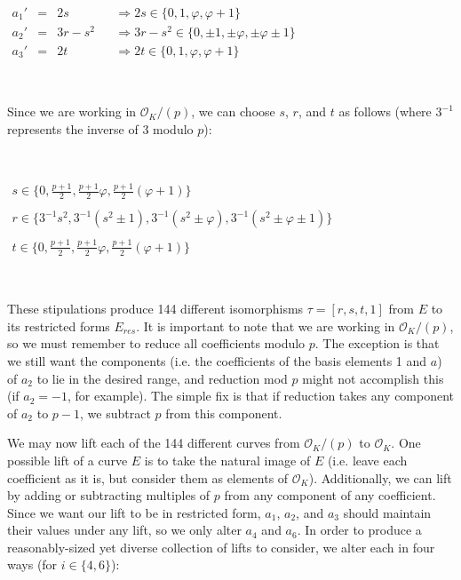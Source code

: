 \

$\begin{array}{rcllll}
a_1'&=&2s&&\Rightarrow2s\in\{0,1,\varphi,\varphi+1\}\\             
a_2'&=&3r-s^2&&\Rightarrow3r-s^2\in\{0,\pm 1, \pm \varphi, \pm \varphi \pm 1\}\\
a_3'&=&2t&&\Rightarrow2t\in\{0,1,\varphi,\varphi+1\}
\end{array}$

\

\noindent Since we are working in $\mathcal{O}_K/(p)$, we can choose $s$, $r$, and $t$ as follows (where $3^{-1}$ represents the inverse of 3 modulo $p$):

\

$\begin{array}{l}
s\in\{0,\frac{p+1}{2},\frac{p+1}{2}\varphi,\frac{p+1}{2}(\varphi+1)\} \\
\\
r\in\{3^{-1}s^2,3^{-1}(s^2\pm 1),3^{-1}(s^2\pm \varphi),3^{-1}(s^2\pm \varphi\pm 1)\} \\
\\
t\in\{0,\frac{p+1}{2},\frac{p+1}{2}\varphi,\frac{p+1}{2}(\varphi+1)\}
\end{array}$

\

\noindent These stipulations produce 144 different isomorphisms $\tau = [r,s,t,1]$ from $E$ to its restricted forms $E_{res}$. It is important to note that we are working in $\mathcal{O}_K/(p)$, so we must remember to reduce all coefficients modulo $p$. The exception is that we still want the components (i.e. the coefficients of the basis elements 1 and $a$) of $a_2$ to lie in the desired range, and reduction mod $p$ might not accomplish this (if $a_2=-1$, for example). The simple fix is that if reduction takes any component of $a_2$ to $p-1$, we subtract $p$ from this component.

We may now lift each of the 144 different curves from $\mathcal{O}_K/(p)$ to $\mathcal{O}_K$. One possible lift of a curve $E$ is to take the natural image of $E$ (i.e. leave each coefficient as it is, but consider them as elements of $\mathcal{O}_K$). Additionally, we can lift by adding or subtracting multiples of $p$ from any component of any coefficient. Since we want our lift to be in restricted form, $a_1$, $a_2$, and $a_3$ should maintain their values under any lift, so we only alter $a_4$ and $a_6$. In order to produce a reasonably-sized yet diverse collection of lifts to consider, we alter each in four ways (for $i \in \{4,6\}$):

